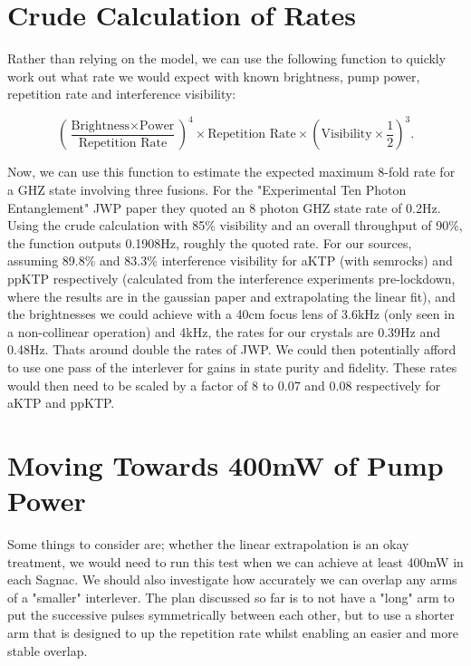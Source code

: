 \documentclass[aps,floatfix,superscriptaddress,onecolumn,tightenlines,amsmath,amssymb,nofootinbib,raggedbottom,nobalancelastpage,10pt]{revtex4-2}
\begin{document}
\section*{Crude Calculation of Rates} 

Rather than relying on the model, we can use the following function to quickly work out what rate we would expect with known brightness,  pump power, repetition rate and interference visibility:

 \begin{equation}
	(\frac{\text{Brightness}\times\text{Power}}{\text{Repetition Rate}})^{4} \times \text{Repetition Rate} \times (\text{Visibility} \times \frac{1}{2})^{3}.
\end{equation}

Now, we can use this function to estimate the expected maximum 8-fold rate for a GHZ state involving three fusions. For the "Experimental Ten Photon Entanglement" JWP paper they quoted an 8 photon GHZ state rate of 0.2Hz. Using the crude calculation with 85\% visibility and an overall throughput of 90\%, the function outputs 0.1908Hz, roughly the quoted rate. For our sources, assuming 89.8\% and 83.3\% interference visibility for aKTP (with semrocks) and ppKTP respectively (calculated from the interference experiments pre-lockdown, where the results are in the gaussian paper and extrapolating the linear fit), and the brightnesses we could achieve with a 40cm focus lens of 3.6kHz (only seen in a non-collinear operation) and 4kHz, the rates for our crystals are 0.39Hz and 0.48Hz. Thats around double the rates of JWP. We could then potentially afford to use one pass of the interlever for gains in state purity and fidelity. These rates would then need to be scaled by a factor of 8 to 0.07 and 0.08 respectively for aKTP and ppKTP.

\section*{Moving Towards 400mW of Pump Power} 

Some things to consider are; whether the linear extrapolation is an okay treatment, we would need to run this test when we can achieve at least 400mW in each Sagnac. We should also investigate how accurately we can overlap any arms of a "smaller" interlever. The plan discussed so far is to not have a "long" arm to put the successive pulses symmetrically between each other, but to use a shorter arm that is designed to up the repetition rate whilst enabling an easier and more stable overlap.
\end{document}
